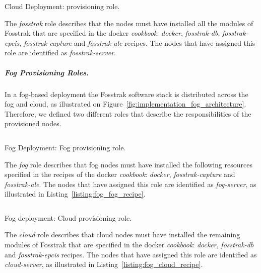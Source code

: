 \begin{listing}[ht!]
\inputminted[frame=lines,
             framesep=3mm,
             linenos=true,
             xleftmargin=21pt,
             tabsize=4]{json}{./listings/fosstrak_role.json}
\caption{Cloud Deployment: provisioning role.}
\label{listing:cloud_recipe}
\end{listing}

The \textit{fosstrak} role describes that the nodes must have installed all the modules of Fosstrak
that are specified in the docker \textit{cookbook}: \textit{docker}, \textit{fosstrak-db},
\textit{fosstrak-epcis}, \textit{fosstrak-capture} and \textit{fosstrak-ale} recipes. The nodes
that have assigned this role are identified as \textit{fosstrak-server}.

\subparagraph{Fog Provisioning Roles.}
\label{subp:fog_roles}
In a fog-based deployment the Fosstrak software stack is distributed across the fog and cloud,
as illustrated on Figure~\ref{fig:implementation_fog_architecture}. Therefore, we defined two different
roles that describe the responsibilities of the provisioned nodes.

\begin{listing}[ht!]
\inputminted[frame=lines,
             framesep=3mm,
             linenos=true,
             xleftmargin=21pt,
             tabsize=4]{json}{./listings/fog_role.json}
\caption{Fog Deployment: Fog provisioning role.}
\label{listing:fog_fog_recipe}
\end{listing}

The \textit{fog} role describes that fog nodes must have installed the following resources specified in the
recipes of the docker \textit{cookbook}: \textit{docker}, \textit{fosstrak-capture} and
\textit{fosstrak-ale}. The nodes that have assigned this role are identified as \textit{fog-server},
as illustrated in Listing~\ref{listing:fog_fog_recipe}.\\

\begin{listing}[ht!]
\inputminted[frame=lines,
             framesep=3mm,
             linenos=true,
             xleftmargin=21pt,
             tabsize=4]{json}{./listings/cloud_role.json}
\caption{Fog deployment: Cloud provisioning role.}
\label{listing:fog_cloud_recipe}
\end{listing}

The \textit{cloud} role describes that cloud nodes must have installed the remaining modules of Fosstrak
that are specified in the docker \textit{cookbook}: \textit{docker}, \textit{fosstrak-db} and
\textit{fosstrak-epcis} recipes. The nodes that have assigned this role are identified as
\textit{cloud-server}, as illustrated in Listing~\ref{listing:fog_cloud_recipe}.

